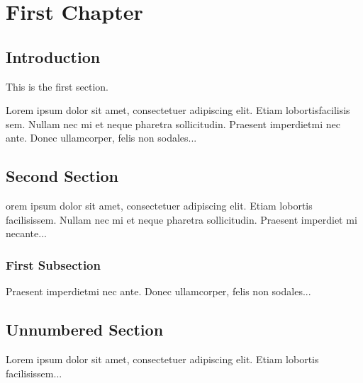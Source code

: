 \documentclass{book}
\begin{document}
	\chapter{First Chapter}
	
	\section{Introduction}
	
	This is the first section.
	
	Lorem  ipsum  dolor  sit  amet,  consectetuer  adipiscing  
	elit. Etiam  lobortisfacilisis sem.  Nullam nec mi et 
	neque pharetra sollicitudin.  Praesent imperdietmi nec ante. 
	Donec ullamcorper, felis non sodales...
	
	\section{Second Section}
	
	orem ipsum dolor sit amet, consectetuer adipiscing elit.  
	Etiam lobortis facilisissem.  Nullam nec mi et neque pharetra 
	sollicitudin.  Praesent imperdiet mi necante...
	
	\subsection{First Subsection}
	Praesent imperdietmi nec ante. Donec ullamcorper, felis non sodales...
	
	\section*{Unnumbered Section}
	Lorem ipsum dolor sit amet, consectetuer adipiscing elit.  
	Etiam lobortis facilisissem...
\end{document}
